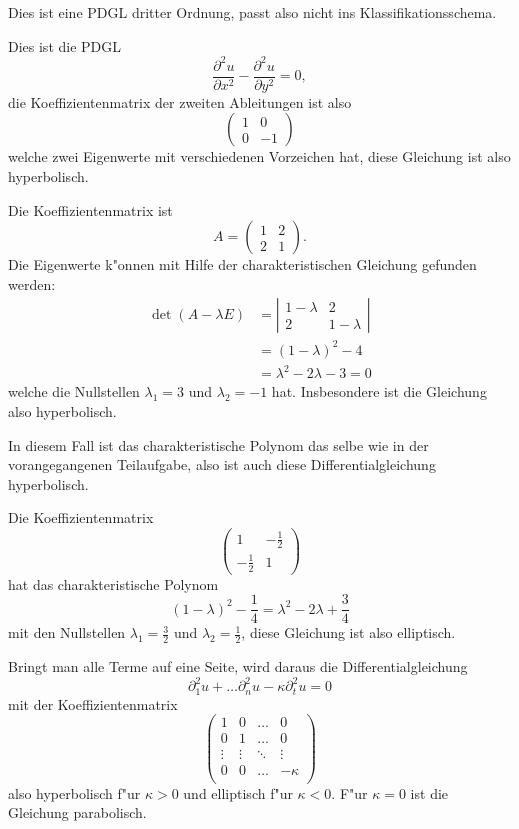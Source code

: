 \begin{loesung}
\begin{teilaufgaben}
\item Dies ist eine PDGL dritter Ordnung, passt also nicht ins
Klassifikationsschema.
\item Dies ist die PDGL
\[
\frac{\partial^2u}{\partial x^2}-\frac{\partial^2 u}{\partial y^2}=0,
\]
die Koeffizientenmatrix der zweiten Ableitungen ist also
\[
\begin{pmatrix}
1&0\\0&-1
\end{pmatrix}
\]
welche zwei Eigenwerte mit verschiedenen Vorzeichen hat, diese Gleichung
ist also hyperbolisch.
\item Die Koeffizientenmatrix ist
\[
A=\begin{pmatrix}
1&2\\2&1
\end{pmatrix}.
\]
Die Eigenwerte k"onnen mit Hilfe der charakteristischen Gleichung
gefunden werden:
\begin{align*}
\det(A-\lambda E)
&=
\left|\begin{matrix} 1-\lambda&2\\2&1-\lambda\end{matrix}\right|
\\
&=(1-\lambda)^2-4\\
&=\lambda^2-2\lambda-3=0
\end{align*}
welche die Nullstellen $\lambda_1=3$ und $\lambda_2=-1$ hat.
Insbesondere ist die Gleichung also hyperbolisch.
\item
In diesem Fall ist das charakteristische Polynom das selbe wie in
der vorangegangenen Teilaufgabe, also ist auch diese Differentialgleichung
hyperbolisch.
\item Die Koeffizientenmatrix
\[
\begin{pmatrix}
1&-\frac12\\
-\frac12&1
\end{pmatrix}
\]
hat das charakteristische Polynom
\[
(1-\lambda)^2-\frac14=\lambda^2-2\lambda+\frac34
\]
mit den Nullstellen $\lambda_1=\frac32$ und $\lambda_2=\frac12$,
diese Gleichung ist also elliptisch.
\item
Bringt man alle Terme auf eine Seite, wird daraus die Differentialgleichung
\[
\partial_1^2u+\dots\partial_n^2u-\kappa\partial_t^2u=0
\]
mit der Koeffizientenmatrix
\[
\begin{pmatrix}
1&0&\dots&0\\
0&1&\dots&0\\
\vdots&\vdots&\ddots&\vdots\\
0&0&\dots&-\kappa\\
\end{pmatrix}
\]
also hyperbolisch f"ur $\kappa > 0$ und elliptisch f"ur $\kappa < 0$.
F"ur $\kappa=0$ ist die Gleichung parabolisch.
\end{teilaufgaben}
\end{loesung}
